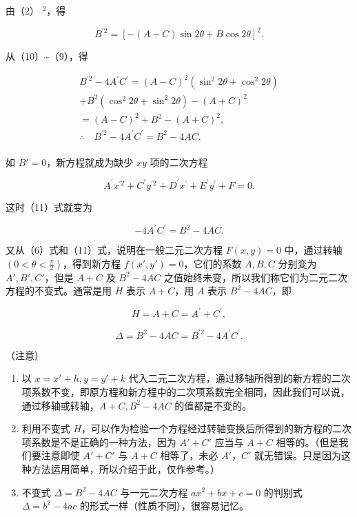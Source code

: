 由（2） \(^{2}\)，得

\[
B^{\prime 2} = [ - (A - C) \sin 2 \theta + B \cos 2 \theta ] ^ {2}. \tag {10}
\]

从（10）\textasciitilde（9），得

\[
\begin{array}{l} B^{\prime 2} - 4 A^{\prime} C^{\prime} = (A - C) ^ {2} (\sin^{2} 2 \theta + \cos^{2} 2 \theta) \\ + B^{2} \left(\cos^{2} 2 \theta + \sin^{2} 2 \theta\right) - (A + C) ^ {2} \\ = (A - C) ^ {2} + B^{2} - (A + C) ^ {2}, \\ \therefore \quad B^{\prime 2} - 4 A^{\prime} C^{\prime} = B^{2} - 4 AC. \tag {11} \\ \end{array}
\]

如 \(B' = 0\)，新方程就成为缺少 \(xy\) 项的二次方程

\[
A^{\prime} x^{\prime 2} + C^{\prime} y^{\prime 2} + D^{\prime} x^{\prime} + E^{\prime} y^{\prime} + F = 0.
\]

这时（11）式就变为

\[
- 4 A^{\prime} C^{\prime} = B^{2} - 4 AC.
\]

又从（6）式和（11）式，说明在一般二元二次方程 \(F(x, y) = 0\)
中，通过转轴 \(\left(0 < \theta < \frac{\pi}{2}\right)\)，得到新方程
\(f(x', y') = 0\)，它们的系数 \(A, B, C\) 分别变为 \(A', B', C'\)，但是
\(A + C\) 及 \(B^2 - 4AC\)
之值始终未变，所以我们称它们为二元二次方程的不变式。通常是用 \(H\) 表示
\(A + C\)，用 \(A\) 表示 \(B^2 - 4AC\)，即

\[
H = A + C = A^{\prime} + C^{\prime},
\]

\[
\Delta = B^{2} - 4 AC = B^{\prime 2} - 4 A^{\prime} C^{\prime}.
\]

（注意）

\begin{enumerate}
\def\labelenumi{\arabic{enumi}.}
\item
  以 \(x = x' + h, y = y' + k\)
  代入二元二次方程，通过移轴所得到的新方程的二次项系数不变，即原方程和新方程中的二次项系数完全相同，因此我们可以说，通过移轴或转轴，\(A + C, B^2 - 4AC\)
  的值都是不变的。
\item
  利用不变式
  \(H\)，可以作为检验一个方程经过转轴变换后所得到的新方程的二次项系数是不是正确的一种方法，因为
  \(A' + C'\) 应当与 \(A + C\) 相等的。（但是我们要注意即使 \(A' + C'\)
  与 \(A + C\) 相等了，未必 \(A'\)，\(C'\)
  就无错误。只是因为这种方法运用简单，所以介绍于此，仅作参考。）
\item
  不变式 \(\Delta = B^2 - 4AC\) 与一元二次方程 \(ax^2 + bx + c = 0\)
  的判别式 \(\Delta = b^2 - 4ac\) 的形式一样（性质不同），很容易记忆。
\end{enumerate}

